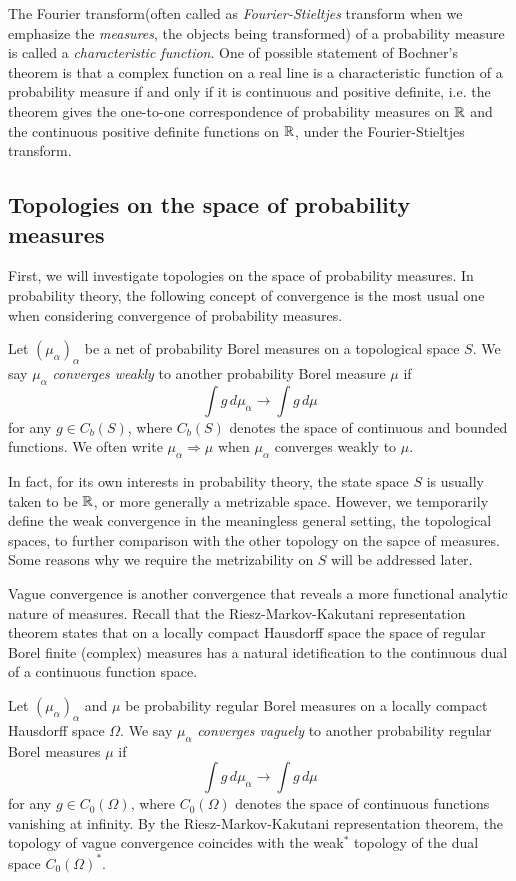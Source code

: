 \documentclass[a4paper]{article}
\begin{document}
The Fourier transform(often called as \emph{Fourier-Stieltjes} transform when we emphasize the \emph{measures}, the objects being transformed) of a probability measure is called a \emph{characteristic function}.
One of possible statement of Bochner's theorem is that a complex function on a real line is a characteristic function of a probability measure if and only if it is continuous and positive definite, i.e. the theorem gives the one-to-one correspondence of probability measures on $\mathbb{R}$ and the continuous positive definite functions on $\mathbb{R}$, under the Fourier-Stieltjes transform.


\subsection{Topologies on the space of probability measures}

First, we will investigate topologies on the space of probability measures.
In probability theory, the following concept of convergence is the most usual one when considering convergence of probability measures.

\begin{defn}
Let $(\mu_\alpha)_\alpha$ be a net of probability Borel measures on a topological space $S$.
We say $\mu_\alpha$ \emph{converges weakly} to another probability Borel measure $\mu$ if
\[\int g\,d\mu_\alpha\to\int g\,d\mu\]
for any $g\in C_b(S)$, where $C_b(S)$ denotes the space of continuous and bounded functions.
We often write $\mu_\alpha\Rightarrow\mu$ when $\mu_\alpha$ converges weakly to $\mu$.
\end{defn}

In fact, for its own interests in probability theory, the state space $S$ is usually taken to be $\mathbb{R}$, or more generally a metrizable space.
However, we temporarily define the weak convergence in the meaningless general setting, the topological spaces, to further comparison with the other topology on the sapce of measures.
Some reasons why we require the metrizability on $S$ will be addressed later.

Vague convergence is another convergence that reveals a more functional analytic nature of measures.
Recall that the Riesz-Markov-Kakutani representation theorem states that on a locally compact Hausdorff space the space of regular Borel finite (complex) measures has a natural idetification to the continuous dual of a continuous function space.

\begin{defn}
Let $(\mu_\alpha)_\alpha$ and $\mu$ be probability regular Borel measures on a locally compact Hausdorff space $\Omega$.
We say $\mu_\alpha$ \emph{converges vaguely} to another probability regular Borel measures $\mu$ if
\[\int g\,d\mu_\alpha\to\int g\,d\mu\]
for any $g\in C_0(\Omega)$, where $C_0(\Omega)$ denotes the space of continuous functions vanishing at infinity.
By the Riesz-Markov-Kakutani representation theorem, the topology of vague convergence coincides with the weak$^*$ topology of the dual space $C_0(\Omega)^*$.
\end{defn}
\end{document}
